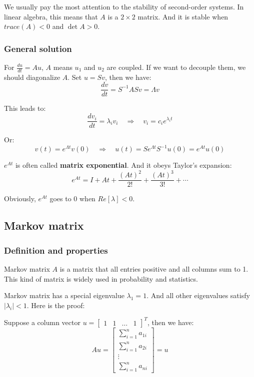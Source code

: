 \documentclass[12pt]{ctexart}
\begin{document}
We usually pay the most attention to the stability of second-order systems. In linear
algebra, this means that $A$ is a $2 \times 2$ matrix. And it is stable when $trace(A) < 0$
and $\det A > 0$.

\subsubsection{\textbf{General solution}}

For $\frac{du}{dt} = Au$, $A$ means $u_1$ and $u_2$ are coupled. If we want to
decouple them, we should diagonalize $A$. Set $u = Sv$, then we have:
\[
  \frac{dv}{dt} = S^{-1}ASv = \Lambda v
\]

This leads to:
\[
  \frac{dv_i}{dt} = \lambda_i v_i \quad \Rightarrow \quad v_i = c_i e^{\lambda_i t}
\]

Or:
\[
  v(t) = e^{\Lambda t} v(0) \quad \Rightarrow \quad u(t) = Se^{\Lambda t}S^{-1}u(0)
  = e^{At}u(0)
\]

$e^{At}$ is often called \textbf{matrix exponential}. And it obeys Taylor's expansion:
\[
  e^{At} = I + At + \frac{(At)^2}{2!} + \frac{(At)^3}{3!} + \cdots
\]

Obviously, $e^{At}$ goes to 0 when $Re[\lambda] < 0$.

\subsection{\textbf{Markov matrix}}
\subsubsection{\textbf{Definition and properties}}

Markov matrix $A$ is a matrix that all entries positive and all columns sum to 1. This
kind of matrix is widely used in probability and statistics.

Markov matrix has a special eigenvalue $\lambda_1 = 1$. And all other eigenvalues satisfy
$|\lambda_i| < 1$. Here is the proof:

Suppose a column vector $u = \begin{bmatrix}1 & 1 & \ldots & 1\end{bmatrix}^T$, then we
have:
\[
  Au = \begin{bmatrix}
  \sum_{i=1}^{n} a_{1i} \\
  \sum_{i=1}^{n} a_{2i} \\
  \vdots \\
  \sum_{i=1}^{n} a_{ni}
  \end{bmatrix}
  = u
\]
\end{document}
